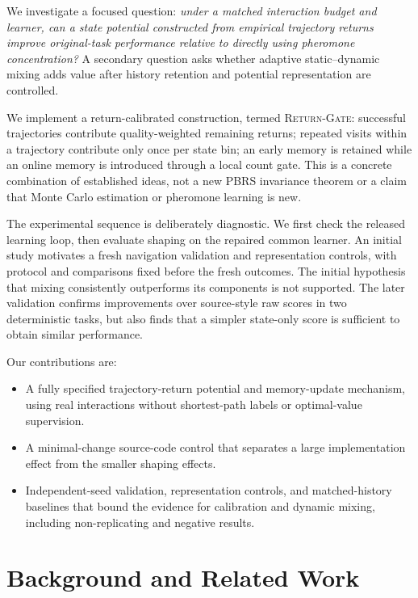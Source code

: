 \documentclass[10pt,twocolumn,letterpaper]{article}
\newcommand{\gate}{\textsc{Return-Gate}}
\begin{document}
We investigate a focused question: \emph{under a matched interaction budget and learner, can a state potential constructed from empirical trajectory returns improve original-task performance relative to directly using pheromone concentration?} A secondary question asks whether adaptive static--dynamic mixing adds value after history retention and potential representation are controlled.

We implement a return-calibrated construction, termed \gate: successful trajectories contribute quality-weighted remaining returns; repeated visits within a trajectory contribute only once per state bin; an early memory is retained while an online memory is introduced through a local count gate. This is a concrete combination of established ideas, not a new PBRS invariance theorem or a claim that Monte Carlo estimation or pheromone learning is new.

The experimental sequence is deliberately diagnostic. We first check the released learning loop, then evaluate shaping on the repaired common learner. An initial study motivates a fresh navigation validation and representation controls, with protocol and comparisons fixed before the fresh outcomes. The initial hypothesis that mixing consistently outperforms its components is not supported. The later validation confirms improvements over source-style raw scores in two deterministic tasks, but also finds that a simpler state-only score is sufficient to obtain similar performance.

Our contributions are:
\begin{itemize}
 \item A fully specified trajectory-return potential and memory-update mechanism, using real interactions without shortest-path labels or optimal-value supervision.
 \item A minimal-change source-code control that separates a large implementation effect from the smaller shaping effects.
 \item Independent-seed validation, representation controls, and matched-history baselines that bound the evidence for calibration and dynamic mixing, including non-replicating and negative results.
\end{itemize}

\section{Background and Related Work}
\end{document}

